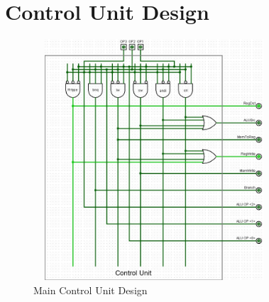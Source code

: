 \documentclass[12pt, dvipsnames, svgnames, x11names, oneside]{book}
\begin{document}
\section{Control Unit Design}
\begin{figure}[H]
\begin{center}
\includegraphics[width=9cm, height=9cm]{./images/cu}
\end{center}
\caption{Main Control Unit Design}
\end{figure}
\end{document}
